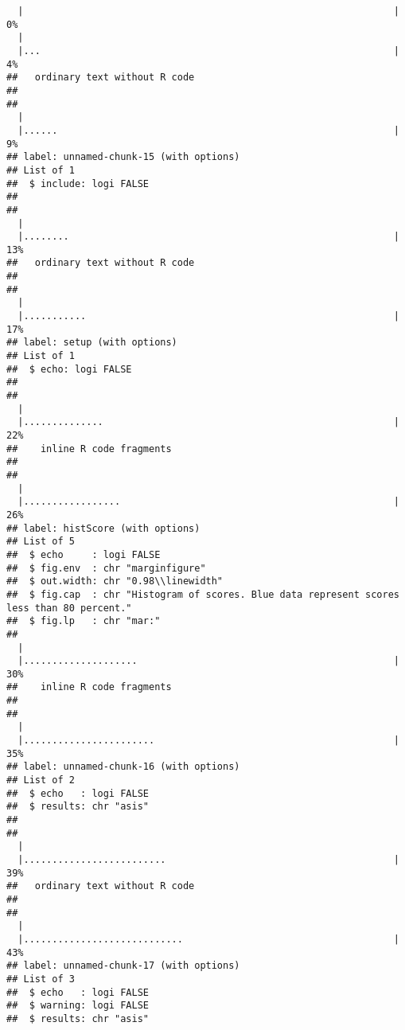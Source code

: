 \documentclass{article}\usepackage[]{graphicx}\usepackage[]{color}
\makeatletter
\newenvironment{kframe}{%
 \def\at@end@of@kframe{}%
 \ifinner\ifhmode%
  \def\at@end@of@kframe{\end{minipage}}%
  \begin{minipage}{\columnwidth}%
 \fi\fi%
 \def\FrameCommand##1{\hskip\@totalleftmargin \hskip-\fboxsep
 \colorbox{shadecolor}{##1}\hskip-\fboxsep
     \hskip-\linewidth \hskip-\@totalleftmargin \hskip\columnwidth}%
 \MakeFramed {\advance\hsize-\width
   \@totalleftmargin\z@ \linewidth\hsize
   \@setminipage}}%
 {\par\unskip\endMakeFramed%
 \at@end@of@kframe}
\newenvironment{knitrout}{}{} %
\numberwithin{equation}{section} %
\makeatother
\begin{document}
\begin{knitrout}
\begin{kframe}
\begin{verbatim}
  |                                                                 |   0%
  |                                                                       
  |...                                                              |   4%
##   ordinary text without R code
## 
## 
  |                                                                       
  |......                                                           |   9%
## label: unnamed-chunk-15 (with options) 
## List of 1
##  $ include: logi FALSE
## 
## 
  |                                                                       
  |........                                                         |  13%
##   ordinary text without R code
## 
## 
  |                                                                       
  |...........                                                      |  17%
## label: setup (with options) 
## List of 1
##  $ echo: logi FALSE
## 
## 
  |                                                                       
  |..............                                                   |  22%
##    inline R code fragments
## 
## 
  |                                                                       
  |.................                                                |  26%
## label: histScore (with options) 
## List of 5
##  $ echo     : logi FALSE
##  $ fig.env  : chr "marginfigure"
##  $ out.width: chr "0.98\\linewidth"
##  $ fig.cap  : chr "Histogram of scores. Blue data represent scores less than 80 percent."
##  $ fig.lp   : chr "mar:"
## 
  |                                                                       
  |....................                                             |  30%
##    inline R code fragments
## 
## 
  |                                                                       
  |.......................                                          |  35%
## label: unnamed-chunk-16 (with options) 
## List of 2
##  $ echo   : logi FALSE
##  $ results: chr "asis"
## 
## 
  |                                                                       
  |.........................                                        |  39%
##   ordinary text without R code
## 
## 
  |                                                                       
  |............................                                     |  43%
## label: unnamed-chunk-17 (with options) 
## List of 3
##  $ echo   : logi FALSE
##  $ warning: logi FALSE
##  $ results: chr "asis"
\end{verbatim}



\end{kframe}
\end{knitrout}
\end{document}
